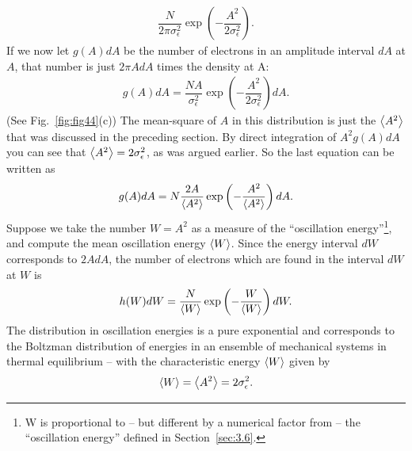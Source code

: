 \begin{align}
	\dfrac{N}{2\pi \sigma_\epsilon^2} \exp\left( -\dfrac{A^2}{2\sigma_\epsilon^2} \right).
\end{align}
If we now let $g(A)dA$ be the number of electrons in an amplitude interval $dA$ at $A$, that number is just $2\pi A dA$ times the density at A:
\begin{align}
	g(A) dA = \dfrac{N A}{\sigma_\epsilon^2} \exp\left( -\dfrac{A^2}{2\sigma_\epsilon^2} \right) dA.
\end{align}
(See Fig.~\ref{fig:fig44}(c)) The mean-square of $A$ in this distribution is just the $\left< A^2 \right>$ that was discussed in the preceding section. By direct integration of $A^2 g(A) dA$ you can see that $\left< A^2 \right> = 2\sigma_\epsilon^2$, as was argued earlier. So the last equation can be written as
\begin{align}
	g(A) dA = N \dfrac{2 A}{\left< A^2 \right>} \exp\left( -\dfrac{A^2}{\left< A^2 \right>} \right) dA.
\end{align}
Suppose we take the number $W = A^2$ as a measure of the ``oscillation energy''\footnote{W is proportional to -- but different by a numerical factor from -- the ``oscillation energy'' defined in Section~\ref{sec:3.6}.}, and compute the mean oscillation energy $\left< W \right>$. Since the energy interval $dW$ corresponds to $2AdA$, the number of electrons which are found in the interval
 $dW$ at $W$ is
\begin{align} \label{eq:5.62}
	h(W)dW = \dfrac{N}{\left< W \right>}\exp\left( -\dfrac{W}{\left< W \right>} \right) dW.
\end{align}
The distribution
 in oscillation energies is a pure exponential and corresponds to the Boltzman distribution of energies in an ensemble of mechanical systems in thermal equilibrium -- with the characteristic
 energy $\left< W \right>$ given by
\begin{align}
	\left< W \right> = \left< A^2 \right> = 2 \sigma_\epsilon^2.
\end{align}
